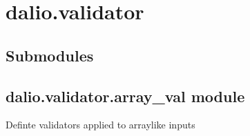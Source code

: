 \documentclass[letterpaper,10pt,english]{sphinxmanual}
\begin{document}
\chapter{dalio.validator}
\label{\detokenize{dalio.validator:dalio-validator}}\label{\detokenize{dalio.validator::doc}}

\section{Submodules}
\label{\detokenize{dalio.validator:submodules}}

\section{dalio.validator.array\_val module}
\label{\detokenize{dalio.validator:module-dalio.validator.array_val}}\label{\detokenize{dalio.validator:dalio-validator-array-val-module}}
Definte validators applied to array\sphinxhyphen{}like inputs
\end{document}
